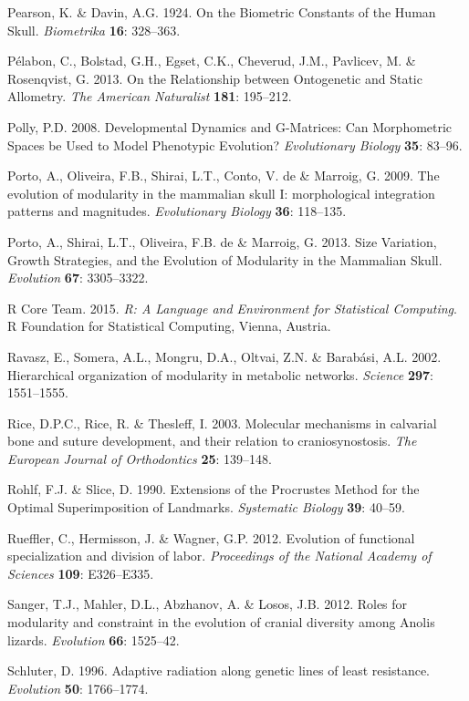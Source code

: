\documentclass[12pt,]{article}
\begin{document}
Pearson, K. \& Davin, A.G. 1924. On the Biometric Constants of the Human
Skull. \emph{Biometrika} \textbf{16}: 328--363.

Pélabon, C., Bolstad, G.H., Egset, C.K., Cheverud, J.M., Pavlicev, M. \&
Rosenqvist, G. 2013. On the Relationship between Ontogenetic and Static
Allometry. \emph{The American Naturalist} \textbf{181}: 195--212.

Polly, P.D. 2008. Developmental Dynamics and G-Matrices: Can
Morphometric Spaces be Used to Model Phenotypic Evolution?
\emph{Evolutionary Biology} \textbf{35}: 83--96.

Porto, A., Oliveira, F.B., Shirai, L.T., Conto, V. de \& Marroig, G.
2009. The evolution of modularity in the mammalian skull I:
morphological integration patterns and magnitudes. \emph{Evolutionary
Biology} \textbf{36}: 118--135.

Porto, A., Shirai, L.T., Oliveira, F.B. de \& Marroig, G. 2013. Size
Variation, Growth Strategies, and the Evolution of Modularity in the
Mammalian Skull. \emph{Evolution} \textbf{67}: 3305--3322.

R Core Team. 2015. \emph{R: A Language and Environment for Statistical
Computing}. R Foundation for Statistical Computing, Vienna, Austria.

Ravasz, E., Somera, A.L., Mongru, D.A., Oltvai, Z.N. \& Barabási, A.L.
2002. Hierarchical organization of modularity in metabolic networks.
\emph{Science} \textbf{297}: 1551--1555.

Rice, D.P.C., Rice, R. \& Thesleff, I. 2003. Molecular mechanisms in
calvarial bone and suture development, and their relation to
craniosynostosis. \emph{The European Journal of Orthodontics}
\textbf{25}: 139--148.

Rohlf, F.J. \& Slice, D. 1990. Extensions of the Procrustes Method for
the Optimal Superimposition of Landmarks. \emph{Systematic Biology}
\textbf{39}: 40--59.

Rueffler, C., Hermisson, J. \& Wagner, G.P. 2012. Evolution of
functional specialization and division of labor. \emph{Proceedings of
the National Academy of Sciences} \textbf{109}: E326--E335.

Sanger, T.J., Mahler, D.L., Abzhanov, A. \& Losos, J.B. 2012. Roles for
modularity and constraint in the evolution of cranial diversity among
Anolis lizards. \emph{Evolution} \textbf{66}: 1525--42.

Schluter, D. 1996. Adaptive radiation along genetic lines of least
resistance. \emph{Evolution} \textbf{50}: 1766--1774.
\end{document}
